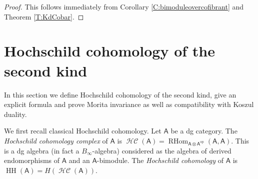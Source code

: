 \documentclass[a4paper]{amsart}
\theoremstyle{plain}
\theoremstyle{definition}
\theoremstyle{remark}
\DeclareMathOperator{\HH}{HH}
\DeclareMathOperator{\HHc}{\mathcal{HC}}
\DeclareMathOperator{\RHom}{RHom}
\newcommand{\op}{\mathrm{op}}
\newcommand{\cat}[1]{\mathsf{#1}}
\numberwithin{equation}{section}
\theoremstyle{plain}
\begin{document}
\begin{proof}
	This follows immediately from Corollary \ref{C:bimoduleovercofibrant} and Theorem \ref{T:KdCobar}.
\end{proof}
	
	\section{Hochschild cohomology of the  second kind}\label{sect:secondkind}
	In this section we define Hochschild cohomology of the  second kind, give an explicit formula and prove Morita invariance as well as compatibility with Koszul duality.
	

	
	
	We first recall classical Hochschild cohomology.
Let $\cat{A}$ be a dg category. 
The \emph{Hochschild cohomology complex} of $\cat{A}$ is $\HHc(\cat{A}) = \RHom_{\cat{A}\otimes\cat{A}^{\op}} (\cat{A},\cat{A})$.
This is a dg algebra (in fact a $B_\infty$-algebra) considered as the algebra of derived endomorphisms of $\cat{A}$ and an $\cat{A}$-bimodule. 
The \emph{Hochschild cohomology} of $\cat{A}$ is $\HH(\cat{A}) = H(\HHc(\cat{A}))$.
\end{document}
